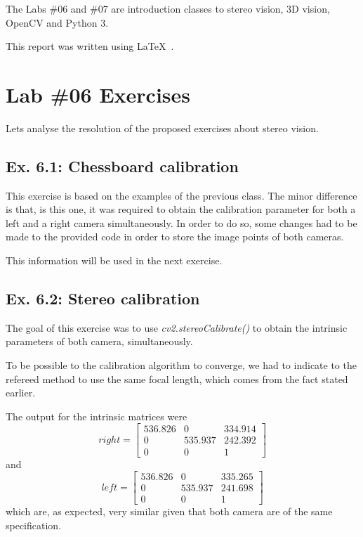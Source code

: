 \documentclass[journal]{IEEEtran}
\begin{document}
The Labs \#06 and \#07 are introduction classes to stereo vision, 3D vision, OpenCV and Python 3. 

This report was written using \LaTeX\ .


\section{Lab \#06 Exercises}

Lets analyse the resolution of the proposed exercises about stereo vision.

\subsection{Ex. 6.1: Chessboard calibration}

This exercise is based on the examples of the previous class. The minor difference is that, is this one, it was required to obtain the calibration parameter for both a left and a right camera simultaneously. In order to do so, some changes had to be made to the provided code in order to store the image points of both cameras.

This information will be used in the next exercise.

\subsection{Ex. 6.2: Stereo calibration}

The goal of this exercise was to use \emph{cv2.stereoCalibrate()} to obtain the intrinsic parameters of both camera, simultaneously.

To be possible to the calibration algorithm to converge, we had to indicate to the refereed method to use the same focal length, which comes from the fact stated earlier. 

The output for the intrinsic matrices were
%
\begin{equation*}
  right = 
  \begin{bmatrix}
    536.826 & 0 & 334.914 \\
    0 & 535.937 & 242.392 \\
    0 & 0 & 1
  \end{bmatrix}
\end{equation*}
%
and
%
\begin{equation*}
  left = 
  \begin{bmatrix}
    536.826 & 0 & 335.265 \\
    0 & 535.937 & 241.698 \\
    0 & 0 & 1
  \end{bmatrix}
\end{equation*}
%
which are, as expected, very similar given that both camera are of the same specification.
\end{document}
